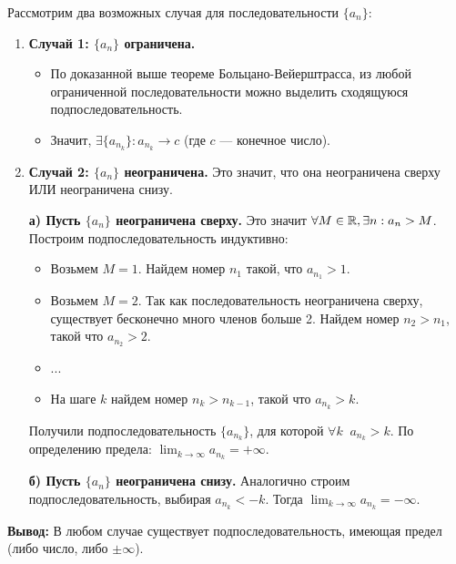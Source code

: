 \begin{tcolorbox}[title=Доказательство]
	Рассмотрим два возможных случая для последовательности $\{a_n\}$:
	
	\begin{enumerate}
		\item \textbf{Случай 1: $\{a_n\}$ ограничена.}
			\begin{itemize}
				\item По доказанной выше теореме Больцано-Вейерштрасса, из любой ограниченной последовательности можно выделить сходящуюся подпоследовательность.
				\item Значит, $\exists \{a_{n_k}\}: a_{n_k} \to c$ (где $c$ — конечное число).
			\end{itemize}
			
		\item \textbf{Случай 2: $\{a_n\}$ неограничена.}
			Это значит, что она неограничена сверху ИЛИ неограничена снизу.
			
			\textbf{а) Пусть $\{a_n\}$ неограничена сверху.}
			Это значит $\forall M \in \mathbb{R}, \exists n: a_n > M$. Построим подпоследовательность индуктивно:
			\begin{itemize}
				\item Возьмем $M=1$. Найдем номер $n_1$ такой, что $a_{n_1} > 1$.
				\item Возьмем $M=2$. Так как последовательность неограничена сверху, существует бесконечно много членов больше 2. Найдем номер $n_2 > n_1$, такой что $a_{n_2} > 2$.
				\item ...
				\item На шаге $k$ найдем номер $n_k > n_{k-1}$, такой что $a_{n_k} > k$.
			\end{itemize}
			Получили подпоследовательность $\{a_{n_k}\}$, для которой $\forall k \;\; a_{n_k} > k$.
			По определению предела: $\lim_{k\to\infty} a_{n_k} = +\infty$.
			
			\textbf{б) Пусть $\{a_n\}$ неограничена снизу.}
			Аналогично строим подпоследовательность, выбирая $a_{n_k} < -k$.
			Тогда $\lim_{k\to\infty} a_{n_k} = -\infty$.
	\end{enumerate}
	
	\textbf{Вывод:} В любом случае существует подпоследовательность, имеющая предел (либо число, либо $\pm \infty$).
\end{tcolorbox}
